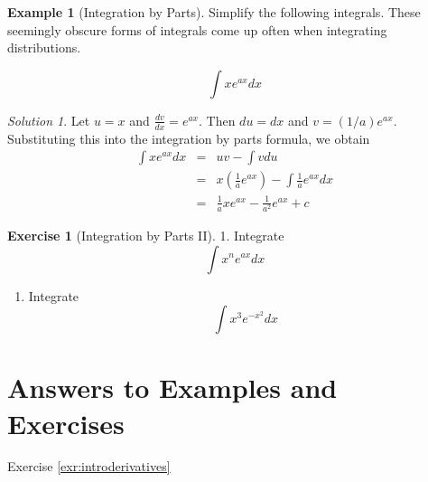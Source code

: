 \documentclass[
]{book}
\providecommand{\tightlist}{%
  \setlength{\itemsep}{0pt}\setlength{\parskip}{0pt}}
\theoremstyle{definition}
\theoremstyle{definition}
\newtheorem{example}{Example}[chapter]
\theoremstyle{definition}
\newtheorem{exercise}{Exercise}[chapter]
\theoremstyle{definition}
\theoremstyle{remark}
\newtheorem*{solution}{Solution}
\begin{document}
\begin{example}[Integration by Parts]
\protect\hypertarget{exm:unnamed-chunk-218}{}{\label{exm:unnamed-chunk-218} {} }Simplify the following integrals. These seemingly obscure forms of integrals come up often when integrating distributions.

\[\int x e^{ax} dx\]
\end{example}

\begin{solution}
{}
Let \(u=x\) and \(\frac{dv}{dx} = e^{ax}\). Then \(du=dx\) and \(v=(1/a)e^{ax}\). Substituting this into the integration by parts formula, we obtain\\
\begin{eqnarray}
\int x e^{ax} dx &=& u v - \int v du\nonumber\\
                &=&x\left( \frac{1}{a}e^{ax}\right) -\int\frac{1}{a}e^{ax}dx\nonumber\\
                &=&\frac{1}{a}xe^{ax}-\frac{1}{a^2}e^{ax}+c\nonumber
\end{eqnarray}
\end{solution}

\begin{exercise}[Integration by Parts II]
\protect\hypertarget{exr:intparts-adv}{}{\label{exr:intparts-adv} {} }
1. Integrate
\[\int x^n e^{ax} dx\]

\begin{enumerate}
\def\labelenumi{\arabic{enumi}.}
\setcounter{enumi}{1}
\tightlist
\item
  Integrate
  \[\int x^3 e^{-x^2} dx\]
\end{enumerate}
\end{exercise}

\hypertarget{answers-to-examples-and-exercises-2}{%
\section*{Answers to Examples and Exercises}\label{answers-to-examples-and-exercises-2}}

Exercise \ref{exr:introderivatives}
\end{document}
